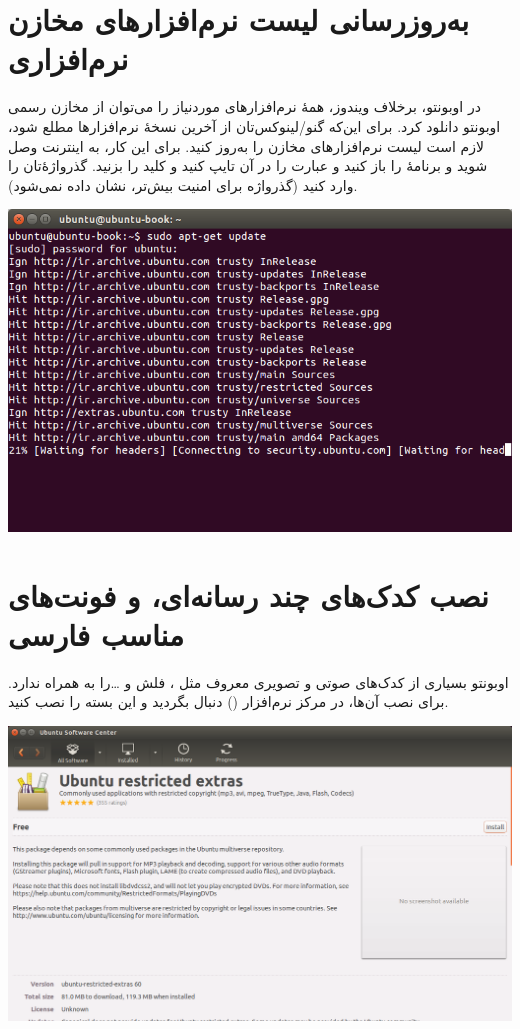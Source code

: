 \section{به‌روزرسانی لیست نرم‌افزارهای مخازن نرم‌افزاری}
در اوبونتو، برخلاف ویندوز، همهٔ نرم‌افزارهای موردنیاز را می‌توان از مخازن رسمی اوبونتو دانلود کرد. برای این‌که گنو/لینوکس‌تان از آخرین نسخهٔ نرم‌افزارها مطلع شود، لازم است لیست نرم‌افزارهای مخازن را به‌روز کنید. برای این کار، به اینترنت وصل شوید و برنامهٔ  را باز کنید و عبارت  را در آن تایپ کنید و کلید  را بزنید. گذرواژه‌ٔ‌تان را وارد کنید (گذرواژه برای امنیت بیش‌تر، نشان داده نمی‌شود).

\begin{center}
\includegraphics[scale=0.5]{pics/29.png}
\end{center}

\section[نصب کدک‌های چند رسانه‌ای، Flash Adobe و فونت‌های مناسب فارسی]{نصب کدک‌های چند رسانه‌ای،  و فونت‌های مناسب فارسی}
اوبونتو بسیاری از کدک‌های صوتی و تصویری معروف مثل ، فلش و \ldots  را به همراه ندارد. برای نصب آن‌ها، در مرکز نرم‌افزار () دنبال  بگردید و این بسته را نصب کنید.

\begin{center}
\includegraphics[scale=0.4]{pics/30.png}
\end{center}

